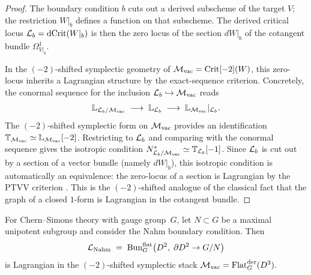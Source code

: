 \begin{proof}
The boundary condition $b$ cuts out a derived subscheme of the
target $V$; the restriction $W|_b$ defines a function on that
subscheme. The derived critical locus $\mathcal L_b =
\operatorname{dCrit}(W|_b)$ is then the zero locus of the section
$dW|_b$ of the cotangent bundle $\Omega^1_{V|_b}$.

In the $(-2)$-shifted symplectic geometry of
$\mathcal M_{\mathrm{vac}} = \operatorname{Crit}[-2](W)$, this zero-locus
inherits a Lagrangian structure by the exact-sequence criterion.
Concretely, the conormal sequence for the inclusion
$\mathcal L_b \hookrightarrow \mathcal M_{\mathrm{vac}}$ reads
\[
 \mathbb{L}_{\mathcal L_b / \mathcal M_{\mathrm{vac}}}
 \;\longrightarrow\;
 \mathbb{L}_{\mathcal L_b}
 \;\longrightarrow\;
 \mathbb{L}_{\mathcal M_{\mathrm{vac}}}|_{\mathcal L_b}.
\]
The $(-2)$-shifted symplectic form on $\mathcal M_{\mathrm{vac}}$ provides
an identification
$\mathbb{T}_{\mathcal M_{\mathrm{vac}}} \simeq
\mathbb{L}_{\mathcal M_{\mathrm{vac}}}[-2]$. Restricting to $\mathcal L_b$ and
comparing with the conormal sequence gives the isotropic condition
$N^*_{\mathcal L_b / \mathcal M_{\mathrm{vac}}} \simeq
\mathbb{T}_{\mathcal L_b}[-1]$. Since $\mathcal L_b$ is cut out by a section
of a vector bundle (namely $dW|_b$), this isotropic condition is
automatically an equivalence: the zero-locus of a section is
Lagrangian by the PTVV criterion \cite{PTVV13}. This is the
$(-2)$-shifted analogue of the classical fact that the graph of a
closed $1$-form is Lagrangian in the cotangent bundle.
\end{proof}

\begin{proposition}
\label{prop:lagrangian-cs}
\ClaimStatusProvedHere
For Chern--Simons theory with gauge group~$G$, let $N \subset G$ be
a maximal unipotent subgroup and consider the Nahm boundary
condition. Then
\[
 \mathcal L_{\mathrm{Nahm}}
 \;=\;
 \operatorname{Bun}_G^{\mathrm{flat}}
 \bigl(D^2,\; \partial D^2 \to G/N\bigr)
\]
is Lagrangian in the $(-2)$-shifted symplectic stack
$\mathcal M_{\mathrm{vac}} =
\operatorname{Flat}_G^{\mathrm{der}}(D^3)$.
\end{proposition}

